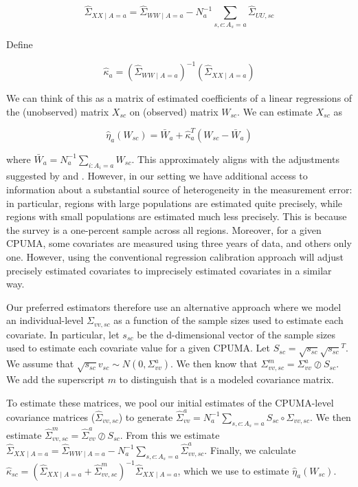 \documentclass{article}
\begin{document}
\begin{appendix}
$$
\hat{\Sigma}_{XX \mid A = a} = \hat{\Sigma}_{WW \mid A = a} - N_a^{-1}\sum_{s, c: A_s = a} \hat{\Sigma}_{UU, sc}
$$

Define

$$
\hat{\kappa}_a = (\hat{\Sigma}_{WW \mid A = a})^{-1}(\hat{\Sigma}_{XX \mid A = a})
$$

We can think of this as a matrix of estimated coefficients of a linear regressions of the (unobserved) matrix $X_{sc}$ on (observed) matrix $W_{sc}$. We can estimate $X_{sc}$ as

$$
\hat{\eta}_a(W_{sc}) = \bar{W}_a + \hat{\kappa}_a^T(W_{sc} - \bar{W}_a)
$$

where $\bar{W}_a = N_a^{-1}\sum_{i: A_i = a} W_{sc}$. This approximately aligns with the adjustments suggested by \cite{carroll2006measurement} and \cite{gleser1992importance}. However, in our setting we have additional access to information about a substantial source of heterogeneity in the measurement error: in particular, regions with large populations are estimated quite precisely, while regions with small populations are estimated much less precisely. This is because the survey is a one-percent sample across all regions. Moreover, for a given CPUMA, some covariates are measured using three years of data, and others only one. However, using the conventional regression calibration approach will adjust precisely estimated covariates to imprecisely estimated covariates in a similar way. 

Our preferred estimators therefore use an alternative approach where we model an individual-level $\Sigma_{vv, sc}$ as a function of the sample sizes used to estimate each covariate. In particular, let $s_{sc}$ be the d-dimensional vector of the sample sizes used to estimate each covariate value for a given CPUMA. Let $S_{sc} = \sqrt{s_{sc}}\sqrt{s_{sc}}^T$. We assume that $\sqrt{s_{sc}}v_{sc} \sim N(0, \Sigma_{vv}^a)$. We then know that $\Sigma_{vv, sc}^m = \Sigma_{vv}^a \oslash S_{sc}$. We add the superscript $m$ to distinguish that is a modeled covariance matrix.

To estimate these matrices, we pool our initial estimates of the CPUMA-level covariance matrices ($\hat{\Sigma}_{vv, sc}$) to generate $\hat{\Sigma}_{vv}^a = N_a^{-1}\sum_{s, c: A_s = a} S_{sc} \circ \Sigma_{vv, sc}$. We then estimate $\hat{\Sigma}_{vv, sc}^m = \hat{\Sigma}_{vv}^a \oslash S_{sc}$. From this we estimate $\hat{\Sigma}_{XX \mid A = a} = \hat{\Sigma}_{WW \mid A = a} - N_a^{-1}\sum_{s, c: A_s = a}\hat{\Sigma}_{vv, sc}^a$. Finally, we calculate $\hat{\kappa}_{sc} = (\hat{\Sigma}_{XX \mid A = a} + \hat{\Sigma}_{vv, sc}^m)^{-1}\hat{\Sigma}_{XX \mid A = a}$, which we use to estimate $\hat{\eta}_a(W_{sc})$. 


\end{appendix}
\end{document}
